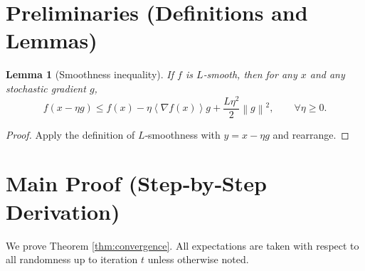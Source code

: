 \documentclass{article}
\newtheorem{lemma}{Lemma}
\newcommand{\norm}[1]{\left\lVert #1\right\rVert}
\newcommand{\inner}[1]{\left\langle #1\right\rangle}
\begin{document}
\newpage
\section*{Preliminaries (Definitions and Lemmas)}
\begin{lemma}[Smoothness inequality]\label{lem:smooth}
If $f$ is $L$‑smooth, then for any $x$ and any stochastic gradient $g$,
\[
f(x-\eta g)\le f(x)-\eta\inner{\nabla f(x)}{g}
               +\frac{L\eta^{2}}{2}\norm{g}^{2},
\qquad\forall \eta\ge 0 .
\]
\end{lemma}
\begin{proof}
Apply the definition of $L$‑smoothness with $y=x-\eta g$ and rearrange. \qedhere
\end{proof}

\section*{Main Proof (Step‑by‑Step Derivation)}
We prove Theorem \ref{thm:convergence}. All expectations are taken with respect to all randomness up to iteration $t$ unless otherwise noted.
\end{document}
